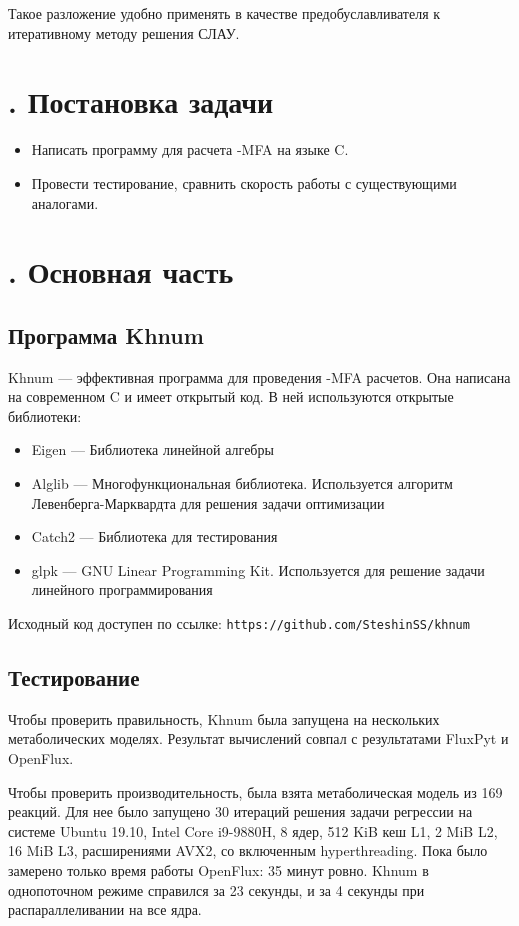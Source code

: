 \documentclass[14pt, a4paper]{extreport}
\newcommand{\CC}{C\nolinebreak\hspace{-.05em}\raisebox{.4ex}{\tiny\bf +}\nolinebreak\hspace{-.10em}\raisebox{.4ex}{\tiny\bf +}}
\def\CC{{C\nolinebreak[4]\hspace{-.05em}\raisebox{.4ex}{\tiny\bf ++}}} %
\begin{document}
Такое разложение удобно применять в качестве предобуславливателя к итеративному методу решения СЛАУ.


\chapter[Постановка задачи]{\thechapter{}. Постановка задачи}
\begin{itemize}
	\item Написать программу для расчета -MFA на языке \CC.
	\item Провести тестирование, сравнить скорость работы с существующими аналогами.
\end{itemize}

\chapter[Основная часть]{\thechapter{}. Основная часть}
\section{Программа Khnum}
Khnum --- эффективная программа для проведения -MFA расчетов. Она написана на современном \CC{} и имеет открытый код. В ней используются открытые библиотеки:
\begin{itemize}
	\item Eigen --- Библиотека линейной алгебры
	\item Alglib --- Многофункциональная библиотека. Используется алгоритм Левенберга-Марквардта для решения задачи оптимизации
	\item Catch2 --- Библиотека для тестирования
	\item glpk --- GNU Linear Programming Kit. Используется для решение задачи линейного программирования
\end{itemize}
Исходный код доступен по ссылке: \texttt{https://github.com/SteshinSS/khnum}

\section{Тестирование}
Чтобы проверить правильность, Khnum была запущена на нескольких метаболических моделях. Результат вычислений совпал с результатами FluxPyt и OpenFlux.

Чтобы проверить производительность, была взята метаболическая модель из 169 реакций. Для нее было запущено 30 итераций решения задачи регрессии на системе Ubuntu 19.10, Intel Core i9-9880H, 8 ядер, 512 KiB кеш L1, 2 MiB L2, 16 MiB L3, расширениями AVX2, со включенным hyperthreading. Пока было замерено только время работы OpenFlux: 35 минут ровно. Khnum в однопоточном режиме справился за 23 секунды, и за 4 секунды при распараллеливании на все ядра.
\end{document}
